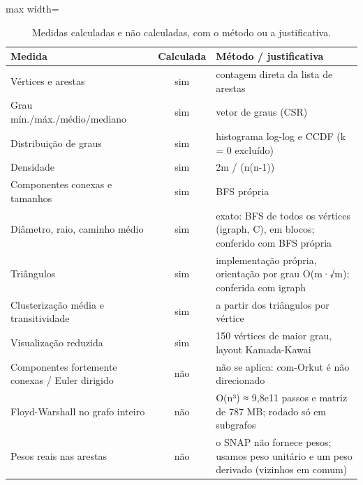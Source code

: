 \begin{table}[!htb]
\centering
\caption{Medidas calculadas e não calculadas, com o método ou a justificativa.}
\label{tab:calculadas}
\begin{adjustbox}{max width=\linewidth}
\begin{tabular}{p{4.6cm}cp{11cm}}
\toprule
Medida & Calculada & Método / justificativa \\
\midrule
Vértices e arestas & sim & contagem direta da lista de arestas \\
Grau mín./máx./médio/mediano & sim & vetor de graus (CSR) \\
Distribuição de graus & sim & histograma log-log e CCDF (k = 0 excluído) \\
Densidade & sim & 2m / (n(n-1)) \\
Componentes conexas e tamanhos & sim & BFS própria \\
Diâmetro, raio, caminho médio & sim & exato: BFS de todos os vértices (igraph, C), em blocos; conferido com BFS própria \\
Triângulos & sim & implementação própria, orientação por grau O(m·√m); conferida com igraph \\
Clusterização média e transitividade & sim & a partir dos triângulos por vértice \\
Visualização reduzida & sim & 150 vértices de maior grau, layout Kamada-Kawai \\
Componentes fortemente conexas / Euler dirigido & não & não se aplica: com-Orkut é não direcionado \\
Floyd-Warshall no grafo inteiro & não & O(n³) ≈ 9,8e11 passos e matriz de 787 MB; rodado só em subgrafos \\
Pesos reais nas arestas & não & o SNAP não fornece pesos; usamos peso unitário e um peso derivado (vizinhos em comum) \\
\bottomrule
\end{tabular}
\end{adjustbox}
\end{table}
